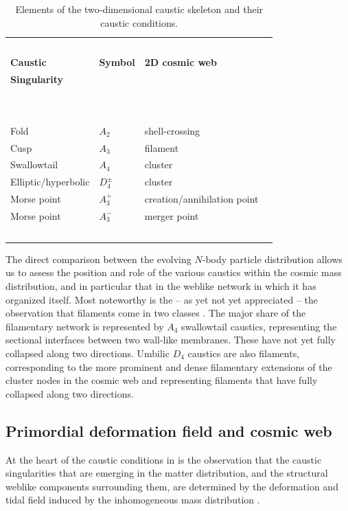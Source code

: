 \documentclass[a4paper, 11pt]{article}
\begin{document}
\begin{table}
\centering
{\scriptsize
\begin{tabular}{ |l | l | l | l |}
  \hline
  \ && \\
\textbf{Caustic} & \textbf{Symbol} & \textbf{2D cosmic web}\\
\textbf{Singularity} & & \\
\ && \\
\hline
\ && \\
Fold & $A_2$ & shell-crossing \\
Cusp & $A_3$ & filament \\
Swallowtail &$A_4$ &  cluster\\
Elliptic/hyperbolic & $D_4^{\pm}$ & cluster\\
Morse point & $A_3^+$ & creation/annihilation point\\
Morse point & $A_3^-$ & merger point\\
\ && \\
\hline
\end{tabular}
}
\caption{Elements of the two-dimensional caustic skeleton and their caustic conditions.}
\label{table:caustics-cosmciweb}
\end{table}

The direct comparison between the evolving $N$-body particle distribution allows us to assess the position and role of the various caustics within the cosmic mass distribution, and in particular that in the weblike network in which it has organized itself. Most noteworthy is the -- as yet not yet appreciated -- the observation that filaments come in two classes \cite{Feldbrugge:2018}. The major share of the filamentary network is represented by $A_4$ swallowtail caustics, representing the sectional interfaces between two wall-like membranes. These have not yet fully collapsed along two directions. Umbilic $D_4$ caustics are also filaments, corresponding to the more prominent and dense filamentary extensions of the cluster nodes in the cosmic web and representing filaments that have fully collapsed along two directions. 

\subsection{Primordial deformation field and cosmic web}
At the heart of the caustic conditions in \cite{Feldbrugge:2018} is the observation that the caustic singularities that are emerging in the matter distribution, and the structural weblike components surrounding them, are determined by the deformation and tidal field induced by the inhomogeneous mass distribution \cite{Zeldovich:1970,Weygaert:1996,Weygaert:2008,Hidding:2014}.
\end{document}
